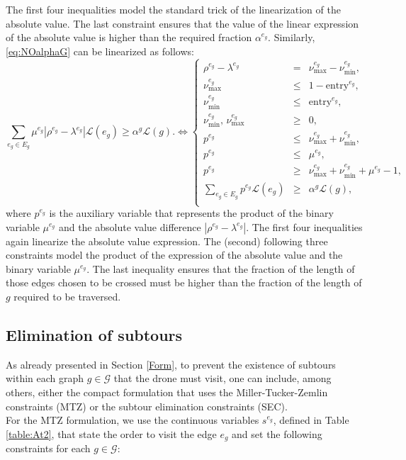 \documentclass[10pt,a4paper]{elsarticle}
\newcommand{\EN}[1]{{\color{black}#1}}
\begin{document}
\noindent
The first four inequalities model the standard trick of the linearization of the absolute value. The last constraint ensures that the value of the linear expression of the absolute value is higher than the required fraction $\alpha^{e_g}$.
\noindent
Similarly, \eqref{eq:NOalphaG} can be linearized as follows:
\begin{equation}\label{eq:NOalpha-G}\tag{$\alpha$-G}
	\sum_{e_g\in E_g} \mu^{e_g}|\rho^{e_g}-\lambda^{e_g}|\mathcal L(e_g)\geq \alpha^g\mathcal L(g). \Longleftrightarrow
	\left\{
	\begin{array}{ccl}
		\rho^{e_g} - \lambda^{e_g}                       & =    & \nu_\text{max}^{e_g} - \nu_\text{min}^{e_g},                                     \\
		\nu_\text{max}^{e_g}                         & \leq & 1-{\text{entry}^{e_g}},                                   \\
		\nu_\text{min}^{e_g}                      & \leq & {  \text{entry}^{e_g}},                                        \\
		\nu_\text{min}^{e_g}, \,\nu_\text{max}^{e_g} & \geq & 0, \\
		p^{e_g} & \leq & \nu_\text{max}^{e_g} + \nu_\text{min}^{e_g}, \\
		p^{e_g} & \leq & \mu^{e_g}, \\
		p^{e_g} & \geq & \nu_\text{max}^{e_g} + \nu_\text{min}^{e_g} + \mu^{e_g} - 1, \\
		\sum_{e_g\in E_g} p^{e_g}\mathcal L(e_g) & \geq & \alpha^{g}\mathcal L(g),
		\\
	\end{array}
	\right.
\end{equation}
where $p^{e_g}$ is the auxiliary variable that represents the product of the binary variable $\mu^{e_g}$ and the absolute value difference $|\rho^{e_g} - \lambda^{e_g}|$. The first four inequalities \EN{again linearize} the absolute value expression. The (second) following three constraints model the product of the expression of the absolute value and the binary variable $\mu^{e_g}$. The last inequality ensures that the fraction of the length of those edges chosen to be crossed must be higher than the fraction of the length of $g$ required to be traversed.

\subsection*{Elimination of subtours}
\noindent
As already presented in Section \ref{Form},  to prevent the existence of subtours within each graph $g\in \mathcal G$ that the drone must visit, one can include, among others, either the compact formulation that uses the Miller-Tucker-Zemlin constraints (MTZ) or the subtour elimination constraints (SEC).\\
\noindent
For the MTZ formulation, we use the continuous variables $s^{e_g}$, defined in Table \ref{table:At2}, that state the order to visit the edge $e_g$ and set the following constraints for each $g\in\mathcal G$:
\end{document}
